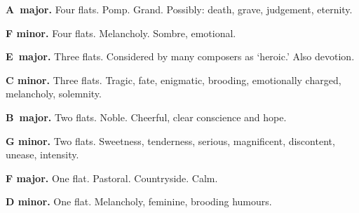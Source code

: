 \noindent\textbf{A\fl\ major.}  Four flats.
Pomp.  Grand. Possibly: death, grave, judgement, eternity.

\noindent\textbf{F minor.}  Four flats.
Melancholy. Sombre, emotional.

\noindent\textbf{E\fl\ major.}  Three flats.
Considered by many composers as `heroic.' Also devotion.

\noindent\textbf{C minor.}  Three flats.
Tragic, fate, enigmatic, brooding,
emotionally charged, melancholy, solemnity.

\noindent\textbf{B\fl\ major.}  Two flats.
Noble. Cheerful, clear conscience and hope.

\noindent\textbf{G minor.}  Two flats.
Sweetness, tenderness, serious, magnificent, discontent, unease, intensity.

\noindent\textbf{F major.}  One flat. 
Pastoral.  Countryside. Calm.

\noindent\textbf{D minor.}  One flat.
Melancholy, feminine, brooding humours.
